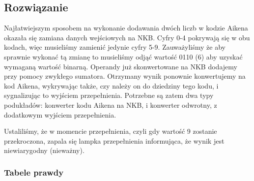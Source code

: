 \documentclass[a4paper,12pt]{extarticle}  %
\begin{document}
\subsection{Rozwiązanie}
Najłatwiejszym sposobem na wykonanie dodawania dwóch liczb w kodzie Aikena okazała się zamiana danych wejściowych na NKB.
Cyfry 0-4 pokrywają się w obu kodach, więc musieliśmy zamienić jedynie cyfry 5-9.
Zauważyliśmy że aby sprawnie wykonać tą zmianę to musieliśmy odjąć wartość 0110 (6) aby uzyskać wymaganą wartość binarną.
Operandy już skonwertowane na NKB dodajemy przy pomocy zwykłego sumatora. Otrzymany wynik ponownie konwertujemy na kod Aikena, wykrywając także, czy należy on do dziedziny tego kodu, i sygnalizując to wyjściem przepełnienia.
Potrzebne są zatem dwa typy podukładów: konwerter kodu Aikena na NKB, i konwerter odwrotny, z dodatkowym wyjściem przepełnienia. 

Ustaliliśmy, że w momencie przepełnienia, czyli gdy wartość 9 zostanie przekroczona, zapala się lampka przepełnienia informująca, że wynik jest niewiarygodny (nieważny).


\subsubsection{Tabele prawdy} %
\end{document}
